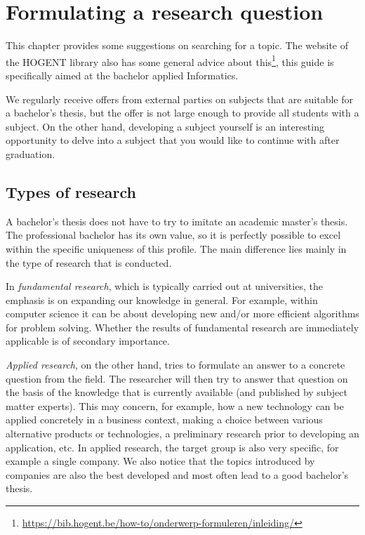 \chapter{Formulating a research question}
\label{ch:researchquestion}

This chapter provides some suggestions on searching for a topic. The website of the HOGENT library also has some general advice about this\footnote{\url{https://bib.hogent.be/how-to/onderwerp-formuleren/inleiding/}}, this guide is specifically aimed at the bachelor applied Informatics.

We regularly receive offers from external parties on subjects that are suitable for a bachelor's thesis, but the offer is not large enough to provide all students with a subject. On the other hand, developing a subject yourself is an interesting opportunity to delve into a subject that you would like to continue with after graduation.

\section{Types of research}
\label{sec:researchtypes}

A bachelor's thesis does not have to try to imitate an academic master's thesis. The professional bachelor has its own value, so it is perfectly possible to excel within the specific uniqueness of this profile. The main difference lies mainly in the type of research that is conducted.

In \emph{fundamental research}, which is typically carried out at universities, the emphasis is on expanding our knowledge in general. For example, within computer science it can be about developing new and/or more efficient algorithms for problem solving. Whether the results of fundamental research are immediately applicable is of secondary importance.

\emph{Applied research}, on the other hand, tries to formulate an answer to a concrete question from the field. The researcher will then try to answer that question on the basis of the knowledge that is currently available (and published by subject matter experts). This may concern, for example, how a new technology can be applied concretely in a business context, making a choice between various alternative products or technologies, a preliminary research prior to developing an application, etc. In applied research, the target group is also very specific, for example a single company. We also notice that the topics introduced by companies are also the best developed and most often lead to a good bachelor's thesis.

